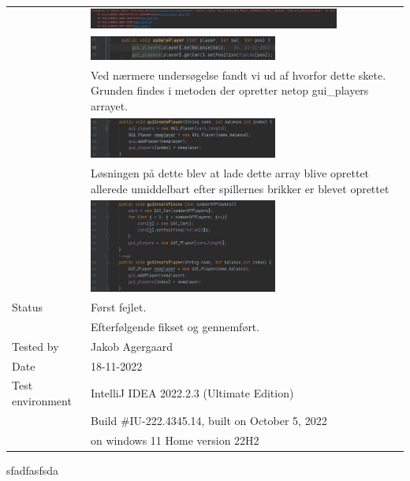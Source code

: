 \documentclass{article}
\begin{document}
\begin{tabular}{ | m{} | m{}|}
     & \includegraphics[width = 0.8\textwidth]{Billeder/TC02-1.jpg}\\
     & \includegraphics[width = 0.6\textwidth]{Billeder/TC02-2.jpg}\\
     & Ved nærmere undersøgelse fandt vi ud af hvorfor dette skete. Grunden findes i metoden der opretter netop gui\_players arrayet.\\
     & \includegraphics[width = 0.6\textwidth]{Billeder/TC02-3.jpg}\\
     & Løsningen på dette blev at lade dette array blive oprettet allerede umiddelbart efter spillernes brikker er blevet oprettet\\
     & \includegraphics[width = 0.6\textwidth]{Billeder/TC02-4.jpg}\\
    \hline
    Status & Først fejlet.\\
     & Efterfølgende fikset og gennemført.\\
    \hline
    Tested by & Jakob Agergaard\\
    \hline
    Date & 18-11-2022\\
    \hline
    Test environment & IntelliJ IDEA 2022.2.3 (Ultimate Edition)\\
      & Build \#IU-222.4345.14, built on October 5, 2022\\
      & on windows 11 Home version 22H2\\
    \hline
\end{tabular}
sfadfasfsda\\
\end{document}
